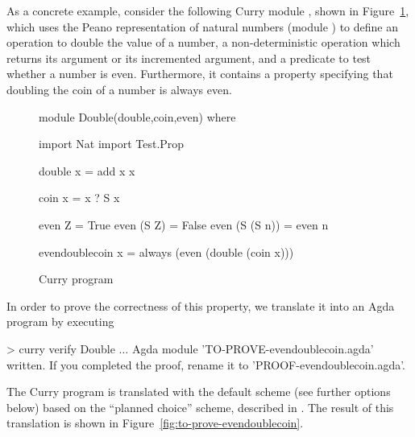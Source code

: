 As a concrete example, consider the following Curry module ,
shown in Figure~\ref{fig:double-curry},
which uses the Peano representation of natural numbers
(module ) to define an operation to double the value
of a number, a non-deterministic operation 
which returns its argument or its incremented argument,
and a predicate to test whether a number is even.
Furthermore, it contains a property specifying that
doubling the coin of a number is always even.

\begin{figure}[t]
\begin{curry}

module Double(double,coin,even) where

import Nat
import Test.Prop

double x = add x x

coin x = x ? S x

even Z         = True
even (S Z)     = False
even (S (S n)) = even n

evendoublecoin x = always (even (double (coin x)))

\end{curry}
\caption{Curry program \label{fig:double-curry}}
\end{figure}

In order to prove the correctness of this property,
we translate it into an Agda program by executing
%
\begin{curry}
> curry verify Double
$\ldots$
Agda module 'TO-PROVE-evendoublecoin.agda' written.
If you completed the proof, rename it to 'PROOF-evendoublecoin.agda'.
\end{curry}
%
The Curry program is translated with
the default scheme (see further options below) based on
the ``planned choice'' scheme, described in \cite{AntoyHanusLibby17EPTCS}.
The result of this translation is shown in
Figure~\ref{fig:to-prove-evendoublecoin}.


